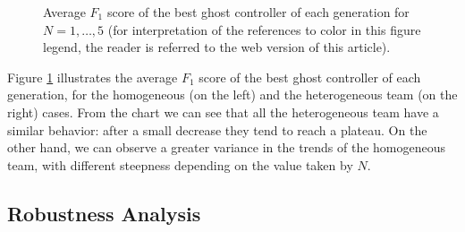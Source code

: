 \documentclass[journal]{IEEEtran}
\begin{document}
\begin{figure}[!t]
  \caption{Average $F_1$ score of the best ghost controller of each generation for $N=1,\ldots,5$ (for interpretation of the references to color in this figure legend, the reader is referred to the web version of this article).}
  \label{fig:GA_trend}
  \centering
\end{figure}

Figure \ref{fig:GA_trend} illustrates the average $F_1$ score of the best ghost controller of each generation, for the homogeneous (on the left) and the heterogeneous team (on the right) cases. From the chart we can see that all the heterogeneous team have a similar behavior: after a small decrease they tend to reach a plateau. On the other hand, we can observe a greater variance in the trends of the homogeneous team, with different steepness depending on the value taken by $N$.

\subsection{Robustness Analysis}
\end{document}
